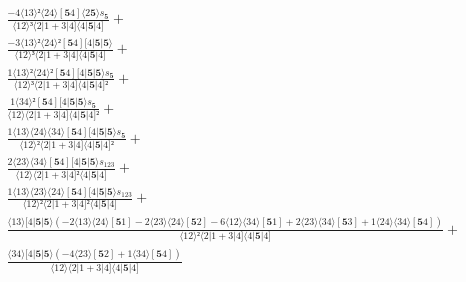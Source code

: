 \documentclass[varwidth, border=5pt]{standalone}
\begin{document}
\begin{my}
$\begin{gathered}
\scriptscriptstyle\frac{-4⟨13⟩²⟨24⟩[𝟓4]⟨2𝟓⟩s_{𝟓}}{⟨12⟩³⟨2|1+3|4]⟨4|𝟓|4]} +\\
\scriptscriptstyle\frac{-3⟨13⟩²⟨24⟩²[𝟓4][4|𝟓|𝟓⟩}{⟨12⟩³⟨2|1+3|4]⟨4|𝟓|4]} +\\
\scriptscriptstyle\frac{1⟨13⟩²⟨24⟩²[𝟓4][4|𝟓|𝟓⟩s_{𝟓}}{⟨12⟩³⟨2|1+3|4]⟨4|𝟓|4]²} +\\
\scriptscriptstyle\frac{1⟨34⟩²[𝟓4][4|𝟓|𝟓⟩s_{𝟓}}{⟨12⟩⟨2|1+3|4]⟨4|𝟓|4]²} +\\
\scriptscriptstyle\frac{1⟨13⟩⟨24⟩⟨34⟩[𝟓4][4|𝟓|𝟓⟩s_{𝟓}}{⟨12⟩²⟨2|1+3|4]⟨4|𝟓|4]²} +\\
\scriptscriptstyle\frac{2⟨23⟩⟨34⟩[𝟓4][4|𝟓|𝟓⟩s_{123}}{⟨12⟩⟨2|1+3|4]²⟨4|𝟓|4]} +\\
\scriptscriptstyle\frac{1⟨13⟩⟨23⟩⟨24⟩[𝟓4][4|𝟓|𝟓⟩s_{123}}{⟨12⟩²⟨2|1+3|4]²⟨4|𝟓|4]} +\\
\scriptscriptstyle\frac{⟨13⟩[4|𝟓|𝟓⟩(-2⟨13⟩⟨24⟩[𝟓1]-2⟨23⟩⟨24⟩[𝟓2]-6⟨12⟩⟨34⟩[𝟓1]+2⟨23⟩⟨34⟩[𝟓3]+1⟨24⟩⟨34⟩[𝟓4])}{⟨12⟩²⟨2|1+3|4]⟨4|𝟓|4]} +\\
\scriptscriptstyle\frac{⟨34⟩[4|𝟓|𝟓⟩(-4⟨23⟩[𝟓2]+1⟨34⟩[𝟓4])}{⟨12⟩⟨2|1+3|4]⟨4|𝟓|4]} \phantom{+}
\end{gathered}$
\end{my}
\end{document}

